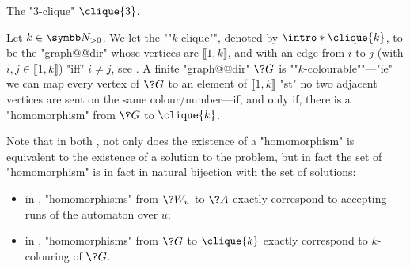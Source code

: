 \begin{marginfigure}
	\centering
	\begin{tikzpicture}
		
	\end{tikzpicture}
	\caption{
		\AP\label{fig:intro-3-clique}
		The "$3$-clique" $\clique{3}$.
	}
\end{marginfigure}
\begin{example}
	\AP\label{ex:graph-colouring-as-hom}
	Let $k\in\Np$. We let the \AP""$k$-clique"", denoted by $\intro*\clique{k}$,
	to be the "graph@@dir" whose vertices are $\lBrack 1,k\rBrack$,
	and with an edge from $i$ to $j$ (with $i,j \in \lBrack 1,k\rBrack$)
	"iff" $i\neq j$, see .
	A finite "graph@@dir" $\?G$ is \AP""$k$-colourable""---"ie"
	we can map every vertex of $\?G$ to an element of $\lBrack 1,k\rBrack$
	"st" no two adjacent vertices are sent on the same colour/number---if,
	and only if, there is a "homomorphism" from $\?G$ to $\clique{k}$.
\end{example}

Note that in both ,
not only does the existence of a "homomorphism" is equivalent to the existence
of a solution to the problem, but in fact the set of "homomorphism" is in fact
in natural bijection with the set of solutions:
\begin{itemize}
	\item in , "homomorphisms" from $\?W_u$ to $\?A$
		exactly correspond to accepting runs of the automaton over $u$;
	\item in , "homomorphisms" from $\?G$ to $\clique{k}$
		exactly correspond to $k$-colouring of $\?G$.
\end{itemize}

